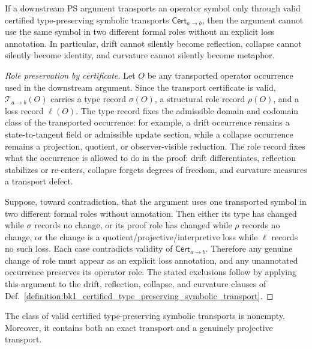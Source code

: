 \begin{proposition}
\label{proposition:bk1_certified_transport_prevents_equivocation}
If a downstream PS argument transports an operator symbol only through valid
certified type-preserving symbolic transports
\(\mathsf{Cert}_{a\to b}\), then the argument cannot use the same symbol in two
different formal roles without an explicit loss annotation.  In particular,
drift cannot silently become reflection, collapse cannot silently become
identity, and curvature cannot silently become metaphor.
\end{proposition}

\begin{proof}[Role preservation by certificate]
\label{proof:bk1_certified_transport_prevents_equivocation}
\leavevmode
Let \(O\) be any transported operator occurrence used in the downstream
argument.  Since the transport certificate is valid,
\(\mathcal{T}_{a\to b}(O)\) carries a type record \(\sigma(O)\), a structural
role record \(\rho(O)\), and a loss record \(\ell(O)\).
The type record fixes the admissible domain and codomain class of the
transported occurrence: for example, a drift occurrence remains a
state-to-tangent field or admissible update section, while a collapse occurrence
remains a projection, quotient, or observer-visible reduction.  The role record
fixes what the occurrence is allowed to do in the proof: drift differentiates,
reflection stabilizes or re-enters, collapse forgets degrees of freedom, and
curvature measures a transport defect.

Suppose, toward contradiction, that the argument uses one transported symbol in
two different formal roles without annotation.  Then either its type has changed
while \(\sigma\) records no change, or its proof role has changed while \(\rho\)
records no change, or the change is a quotient/projective/interpretive loss
while \(\ell\) records no such loss.  Each case contradicts validity of
\(\mathsf{Cert}_{a\to b}\).  Therefore any genuine change of role must appear
as an explicit loss annotation, and any unannotated occurrence preserves its
operator role.  The stated exclusions follow by applying this argument to the
drift, reflection, collapse, and curvature clauses of
Def.~\ref{definition:bk1_certified_type_preserving_symbolic_transport}.
\end{proof}

\begin{proposition}
\label{proposition:bk1_nonvacuity_of_certified_transport}
The class of valid certified type-preserving symbolic transports is nonempty.
Moreover, it contains both an exact transport and a genuinely projective
transport.
\end{proposition}

